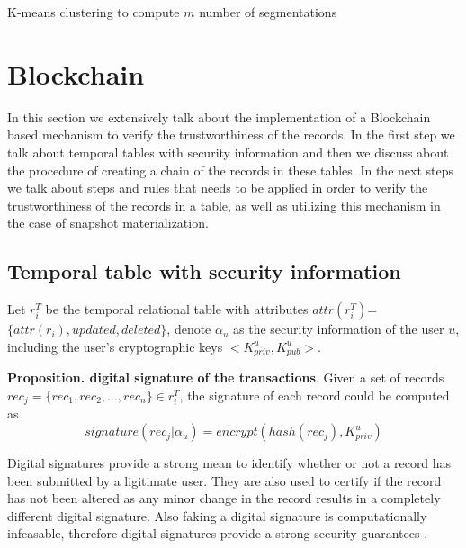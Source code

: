 \begin{algorithm}[H]
\SetAlgoLined
\caption{K-means clustering to compute $m$ number of segmentations}
\label{alg:Kmeans}
\DontPrintSemicolon
\end{algorithm}

\section{Blockchain}
In this section we extensively talk about the implementation of a Blockchain based mechanism to verify the trustworthiness of the records. In the first step we talk about temporal tables with security information and then we discuss about the procedure of creating a chain of the records in these tables. In the next steps we talk about steps and rules that needs to be applied in order to verify the trustworthiness of the records in a table, as well as utilizing this mechanism in the case of snapshot materialization.

\subsection{Temporal table with security information}
Let $r_i^T$ be the temporal relational table with attributes $attr(r_i^T)$=$\{attr(r_i), updated,deleted\}$, denote $\alpha_u$ as the security information of the user $u$, including the user's cryptographic keys $<K_{priv}^u, K_{pub}^u>$.


\textbf{Proposition. digital signature of the transactions}. Given a set of records $rec_j =\{rec_1,rec_2,...,rec_n\} \in r_i^T$, the signature of each record could be computed as $$signature(rec_j|\alpha_u)= encrypt(hash(rec_j),K_{priv}^u)$$  

Digital signatures provide a strong mean to identify whether or not a record has been submitted by a ligitimate user. They are also used to certify if the record has not been altered as any minor change in the record results in a completely different digital signature. Also faking a digital signature is computationally infeasable, therefore digital signatures provide a strong security guarantees \cite{katz2010digital}.

